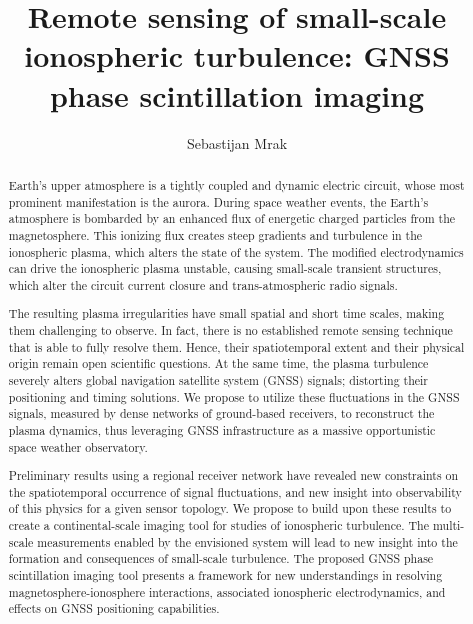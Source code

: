 \documentclass[letterpaper,12pt]{article}
\title{Remote sensing of small-scale ionospheric turbulence: GNSS phase scintillation imaging}
\author{Sebastijan Mrak}
\begin{document}
\maketitle
\thispagestyle{empty}
\begin{abstract}

Earth's upper atmosphere is a tightly coupled and dynamic electric circuit, whose most prominent manifestation is the aurora. During space weather events, the Earth's atmosphere is bombarded by an enhanced flux of energetic charged particles from the magnetosphere. This ionizing flux creates steep gradients and turbulence in the ionospheric plasma, which alters the state of the system. The modified electrodynamics can drive the ionospheric plasma unstable, causing small-scale transient structures, which alter the circuit current closure and trans-atmospheric radio signals.

The resulting plasma irregularities have small spatial and short time scales, making them challenging to observe. In fact, there is no established remote sensing technique that is able to fully resolve them. Hence, their spatiotemporal extent and their physical origin remain open scientific questions. At the same time, the  plasma turbulence severely alters global navigation satellite system (GNSS) signals; distorting their positioning and timing solutions. We propose to utilize these fluctuations in the GNSS signals, measured by dense networks of ground-based receivers, to reconstruct the plasma dynamics, thus leveraging GNSS infrastructure as a massive opportunistic space weather observatory. 

Preliminary results using a regional receiver network have revealed new constraints on the spatiotemporal occurrence of signal fluctuations, and new insight into observability of this physics for a given sensor topology. We propose to build upon these results to create a continental-scale imaging tool for studies of ionospheric turbulence.  The multi-scale measurements enabled by the envisioned system will lead to new insight into the formation and consequences of small-scale  turbulence.  The proposed GNSS phase scintillation imaging tool presents a framework for new understandings in resolving magnetosphere-ionosphere interactions,   associated ionospheric electrodynamics, and effects on GNSS positioning capabilities. 

\end{abstract}
\clearpage
\setcounter{page}{1}
\end{document}
